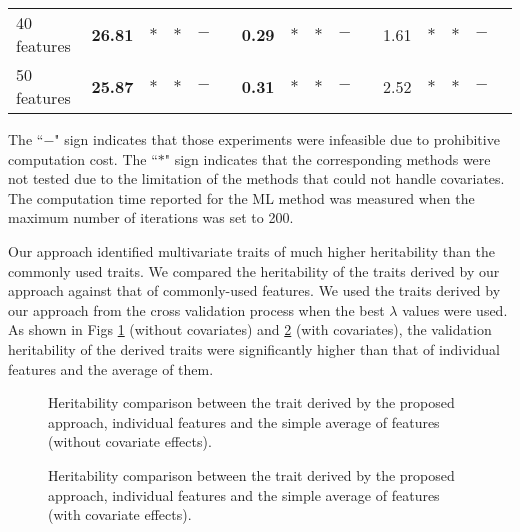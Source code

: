 \documentclass[10pt,letterpaper]{article}
\begin{document}
\begin{table}[!ht]
\begin{adjustwidth}{-2.25in}{0in}
\begin{center}
\begin{small}
\begin{tabular}{lccccccccccccccc}
				40 features	&{\bf 26.81}	& $*$ &	$*$ &	$-$	&		&	{\bf 0.29}	& $*$ &	$*$ &	$-$	&		&	1.61	& $*$ &	$*$ &	$-$  \\
				50 features	&{\bf 25.87}	& $*$ &	$*$ &	$-$	&		&	{\bf 0.31}	& $*$ &	$*$ &	$-$	&		&	2.52	& $*$ &	$*$ &	$-$  \\
				\hline
			\end{tabular}
		\end{small}
	\end{center}
	{\footnotesize The ``$-$" sign indicates that those experiments were infeasible due to prohibitive computation cost.} 
	{\footnotesize The ``$*$" sign indicates that the corresponding methods were not tested due to the limitation of the methods that could not handle covariates. }
		{\footnotesize The computation time reported for the ML method was measured when the maximum number of iterations was set to 200. }
	\vskip -0.1in
\end{adjustwidth}
\end{table}

Our approach identified multivariate traits of much higher heritability than the commonly used traits. We compared the heritability of the traits derived by our approach against that of commonly-used features. We used the traits derived by our approach from the cross validation process when the best $\lambda$ values were used. As shown in Figs \ref{fig:simu_comp_sex_only} (without covariates) and \ref{fig:simu_comp_all_cov} (with covariates), the validation heritability of the derived traits were significantly higher than that of individual features and the average of them. 
\begin{figure}[h!]
\begin{center}
\caption{Heritability comparison between the trait derived by the proposed approach, individual features and the simple average of features (without covariate effects).}
\vspace{-0.2in}
\label{fig:simu_comp_sex_only}
\end{center}
\end{figure}
\begin{figure}[h!]
\begin{center}
\caption{Heritability comparison between the trait derived by the proposed approach, individual features and the simple average of features (with covariate effects).} \vspace{-0.2in}
\label{fig:simu_comp_all_cov}
\end{center}
\end{figure}
\end{document}
